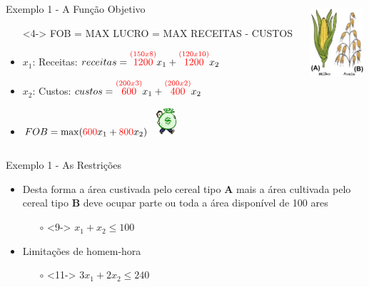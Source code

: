 \documentclass{beamer}
\begin{document}
\begin{frame}
{\begin{columns}
\begin{column}{0.7\textwidth}
\begin{exampleblock}{Exemplo 1 - A Função Objetivo}
				\begin{itemize}
				\item[]<4-> FOB = MAX LUCRO = MAX RECEITAS - CUSTOS
				\item<5-> $x_1$: Receitas: $receitas = \overset{\color{red}(150x8)}{1200}x_1+\overset{\color{red}(120x10)}{1200}x_2$
				\item<6-> $x_2$: Custos: $custos = \overset{\color{red}(200x3)}{600}x_1 + \overset{\color{red}(200x2)}{400}x_2$
				\item<7-> 
				$FOB = \max ({\color{red}600}x_1 + {\color{red}800}x_2)$ \includegraphics[width=1cm,height=1cm]{dinheiro2.jpg}
				\end{itemize}
			\end{exampleblock}
		\end{column}
		\begin{column}{0.3\textwidth}
			\centering
			\includegraphics[width=2cm,height=3cm]{milho_aveia2.png}
		\end{column}
	\end{columns}	
	}
	{
	\begin{columns}
		\begin{column}{0.7\textwidth}
			\centering
			\begin{exampleblock}{Exemplo 1 - As Restrições}
				\scriptsize
				\begin{itemize}
				\item<8-> {Desta forma a área custivada pelo cereal tipo \textbf{A} mais a área cultivada pelo cereal tipo \textbf{B} deve ocupar parte ou toda a área disponível de 100 ares}
					\begin{itemize}
					\item[$\circ$]<9->  $x_1+x_2 \le 100$
					\end{itemize}
				\item<10-> {Limitações de homem-hora}				
					\begin{itemize}
					\item[$\circ$]<11->  $3x_1+2x_2 \le 240$
					\end{itemize}

\end{itemize}
\end{exampleblock}
\end{column}
\end{columns}}
\end{frame}
\end{document}
